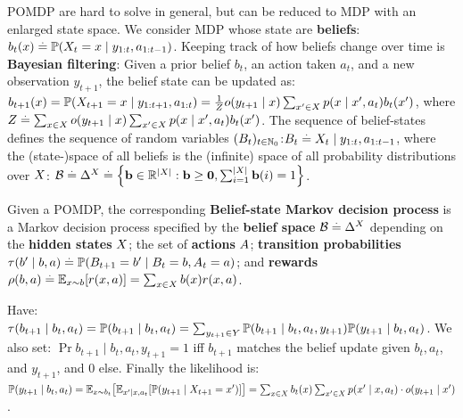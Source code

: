 POMDP are hard to solve in general, but can be reduced to MDP with an enlarged state space. We consider MDP whose state are \textbf{beliefs}: $b_t(x) \defeq \Pr{X_t = x \mid y_{1:t}, a_{1:t-1}}$. Keeping track of how beliefs change over time is \textbf{Bayesian filtering}: Given a prior belief $b_t$, an action taken $a_t$, and a new observation $y_{t+1}$, the belief state can be updated as: $b_{t+1}(x) = \Pr{X_{t+1} = x \mid y_{1:t+1}, a_{1:t}} = \frac{1}{Z} o(y_{t+1} \mid x) \sum_{x' \in \sX} p(x \mid x', a_t) b_t(x')$, where $Z \defeq \sum_{x \in \sX} o(y_{t+1} \mid x) \sum_{x' \in \sX} p(x \mid x', a_t) b_t(x')$.
The sequence of belief-states defines the sequence of random variables $(B_t)_{t\in\Nat_0}$:$ B_t \defeq X_t \mid y_{1:t}, a_{1:t-1}$, where the (state-)space of all beliefs is the (infinite) space of all probability distributions over $\sX$: $\spB \defeq \Delta^{\sX} \defeq \braces*{\vb \in \R^{\card{\sX}} : \vb \geq \vzero, \textstyle\sum_{i=1}^{\card{\sX}} \vb(i) = 1}$.
\begin{framed}
    Given a POMDP, the corresponding \textbf{Belief-state Markov decision process} is a Markov decision process specified by the \textbf{belief space} $\spB \defeq \Delta^{\sX}$ depending on the \textbf{hidden states} $\sX$; the set of \textbf{actions} $\sA$; \textbf{transition probabilities} $\tau(b' \mid b, a) \defeq \Pr{B_{t+1} = b' \mid B_t = b, A_t = a}$; and \textbf{rewards} $\rho(b, a) \defeq \E[x \sim b]{r(x, a)} = \sum_{x \in \sX} b(x) r(x, a)$.
\end{framed}
Have: $\tau(b_{t+1} \mid b_t, a_t) = \Pr{b_{t+1} \mid b_t, a_t} = \sum_{y_{t+1} \in \sY} \Pr{b_{t+1} \mid b_t, a_t, y_{t+1}} \Pr{y_{t+1} \mid b_t, a_t}$. We also set: $\Pr{b_{t+1} \mid b_t, a_t, y_{t+1}} = 1$ iff $b_{t+1}$ matches the belief update given $b_t, a_t$, and $y_{t+1}$, and 0 else. Finally the likelihood is: $\Pr{y_{t+1} \mid b_t, a_t} = \E[x \sim b_t]{\E[x' \mid x, a_t]{\Pr{y_{t+1} \mid X_{t+1} = x'}}} = \sum_{x \in \sX} b_t(x) \sum_{x' \in \sX} p(x' \mid x, a_t) \cdot o(y_{t+1} \mid x')$.
